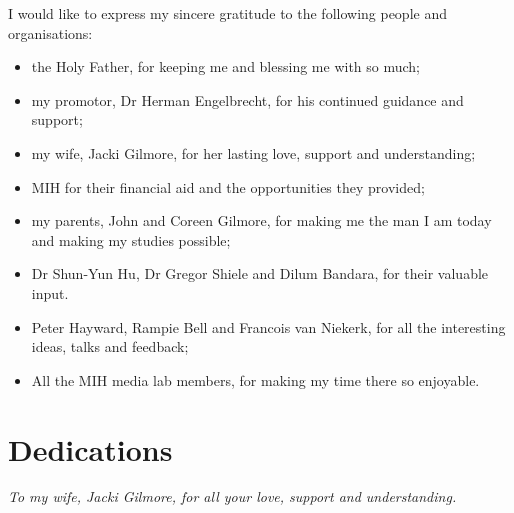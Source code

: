 I would like to express my sincere gratitude to the following people and organisations:
\begin{itemize}
  \item the Holy Father, for keeping me and blessing me with so much;
  \item my promotor, Dr Herman Engelbrecht, for his continued guidance and support;
  \item my wife, Jacki Gilmore, for her lasting love, support and understanding;
  \item MIH for their financial aid and the opportunities they provided;
  \item my parents, John and Coreen Gilmore, for making me the man I am today and making
  my studies possible;
  \item Dr Shun-Yun Hu, Dr Gregor Shiele and Dilum Bandara, for their valuable input.
  \item Peter Hayward, Rampie Bell and Francois van Niekerk, for all the interesting ideas, talks and feedback;
  \item All the MIH media lab members, for making my time there so enjoyable.
\end{itemize}


\chapter{Dedications}%
 \vfill
 \begin{center}\itshape
    To my wife, Jacki Gilmore, for all your love, support and understanding.
 \end{center}
 \vfill
 \clearpage

\endinput
